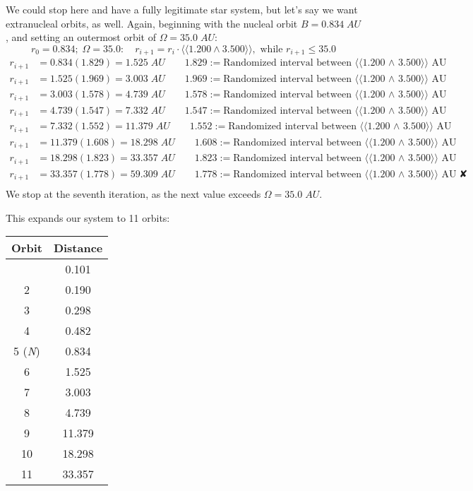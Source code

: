 \documentclass[
  letterpaper,
]{book}
\begin{document}
We could stop here and have a fully legitimate star system, but let's
say we want extranucleal orbits, as well. Again, beginning with the
nucleal orbit \(B = 0.834\;AU\), and setting an outermost orbit of
\(\Omega = 35.0\;AU\): \[
  r_0 = 0.834;\; \Omega = 35.0:
  \quad r_{i+1} = r_i \cdot ⟨⟨1.200 ∧ 3.500⟩⟩, \text{ while } r_{i+1} \leq 35.0
\] \[
\begin{align}
r_{i+1} &= 0.834(1.829) = 1.525\;AU \qquad 1.829 := \text{Randomized interval between ⟨⟨1.200 ∧ 3.500⟩⟩ AU} \\[1em]
r_{i+1} &= 1.525(1.969) = 3.003\;AU \qquad 1.969 := \text{Randomized interval between ⟨⟨1.200 ∧ 3.500⟩⟩ AU} \\[1em]
r_{i+1} &= 3.003(1.578) = 4.739\;AU \qquad 1.578 := \text{Randomized interval between ⟨⟨1.200 ∧ 3.500⟩⟩ AU} \\[1em]
r_{i+1} &= 4.739(1.547) = 7.332\;AU \qquad 1.547 := \text{Randomized interval between ⟨⟨1.200 ∧ 3.500⟩⟩ AU} \\[1em]
r_{i+1} &= 7.332(1.552) = 11.379\;AU \qquad 1.552 := \text{Randomized interval between ⟨⟨1.200 ∧ 3.500⟩⟩ AU} \\[1em]
r_{i+1} &= 11.379(1.608) = 18.298\;AU \qquad 1.608 := \text{Randomized interval between ⟨⟨1.200 ∧ 3.500⟩⟩ AU} \\[1em]
r_{i+1} &= 18.298(1.823) = 33.357\;AU \qquad 1.823 := \text{Randomized interval between ⟨⟨1.200 ∧ 3.500⟩⟩ AU} \\[1em]
r_{i+1} &= 33.357(1.778) = 59.309\;AU \qquad 1.778 := \text{Randomized interval between ⟨⟨1.200 ∧ 3.500⟩⟩ AU} \; ✘ \\[1em]
\end{align}
\] We stop at the seventh iteration, as the next value exceeds
\(\Omega = 35.0\;AU\).

This expands our system to 11 orbits:

\begin{longtable}[]{@{}cc@{}}
\toprule\noalign{}
Orbit & Distance \\
\midrule\noalign{}
\endhead
\bottomrule\noalign{}
\endlastfoot
1 & 0.101 \\
2 & 0.190 \\
3 & 0.298 \\
4 & 0.482 \\
5 (\emph{N}) & 0.834 \\
6 & 1.525 \\
7 & 3.003 \\
8 & 4.739 \\
9 & 11.379 \\
10 & 18.298 \\
11 & 33.357 \\
\end{longtable}
\end{document}
